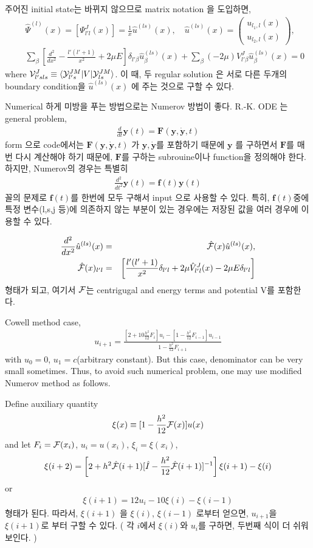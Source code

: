 \documentclass[10pt]{book}
\def\bm{\boldsymbol}
\newcommand{\bea}{\begin{eqnarray}}
\newcommand{\eea}{\end{eqnarray}}
\newcommand{\no}{\nonumber \\}
\def\la{\langle}
\def\ra{\rangle}
\begin{document}
주어진 initial state는 바뀌지 않으므로 matrix notation 을 도입하면,
\bea
& &\hat{\Psi}^{(l)}(x)=[\Psi^J_{l' l}(x)]=\frac{1}{x}\hat{u}^{(ls)}(x),
\quad \hat{u}^{(ls)}(x)=\left(\begin{array}{c} u_{l_1,l}(x) \\ u_{l_2,l}(x) \end{array}\right),\no
& &\sum_{\beta}\left[\frac{d^2}{dx^2}-\frac{l'(l'+1)}{x^2}+2\mu E\right]
   \delta_{l'\beta}\hat{u}^{(ls)}_\beta (x)
   +\sum_\beta (-2\mu )V^J_{l'\beta}\hat{u}^{(ls)}_\beta(x) =0
\eea
where ${\cal V}^{J}_{l's ls}\equiv \la {\cal Y}^{JM}_{l's}|V|{\cal Y}^{JM}_{ls}\ra$.
이 때, 두 regular solution 은 서로 다른 두개의 boundary condition을 
$\hat{u}^{(ls)}(x)$ 에 주는 것으로 구할 수 있다.

Numerical 하게 미방을 푸는 방법으로는 Numerov 방법이 좋다.
R.-K. ODE 는 general problem,
\bea 
\frac{d}{dt}{\bm y}(t)={\bm F}({\bm y},\dot{\bm y}, t)
\eea 
form 으로 code에서는 ${\bm F}({\bm y},\dot{\bm y}, t)$ 가 ${\bm y},\dot{\bm y}$를 
포함하기 때문에 ${\bm y}$ 를 구하면서 ${\bm F}$를 매번 다시 계산해야 하기 때문에,
${\bm F}$를 구하는 subrouine이나 function을 정의해야 한다. 
하지만, Numerov의 경우는 특별히
\bea 
\frac{d^2}{dt^2}{\bm y}(t)={\bm f}(t){\bm y}(t)
\eea 
꼴의 문제로  ${\bm f}(t)$를 한번에 모두 구해서 input 으로 사용할 수 있다. 
특히, ${\bm f}(t)$중에 특정 변수(l,s,j 등)에 의존하지 않는 부분이 있는 경우에는
저장된 값을 여러 경우에 이용할 수 있다. 

\bea
\frac{d^2}{dx^2}\hat{u}^{(ls)}(x)&=&{\cal \hat{F}}(x) \hat{u}^{(ls)}(x),\no
\hat{\cal F}(x)_{l'l}&=&
\left[\frac{l'(l'+1)}{x^2}\delta_{l'l}+2\mu\hat{V}^J_{l'l}(x)-2\mu E\delta_{l'l}
\right]
\eea
형태가 되고, 여기서 ${\cal F}$는 
centrigugal and energy terms and potential V를 포함한다.

Cowell method case,
\bea 
u_{i+1}=\frac{[2+10\frac{h^2}{12}F_i]u_i
    -[1-\frac{h^2}{12}F_{i-1}]u_{i-1}      }{1-\frac{h^2}{12}F_{i+1}}
\eea 
with $u_0=0$, $u_1=c$(arbitrary constant). But this case, denominator can be very small sometimes.
Thus, to avoid such numerical problem, one may use modified Numerov method as follows. 

Define auxiliary quantity 
$$\xi(x)\equiv[1-\frac{h^2}{12}{\cal F}(x)]u(x)$$ 
and let $F_{i}={\cal F}(x_i)$, $u_i=u(x_i)$, $\xi_i=\xi(x_i)$,
\bea
\xi(i+2)=\left[2+h^2{\cal \hat{F}}(i+1)[\hat{I}-\frac{h^2}{12}{\cal\hat{ F}}(i+1)]^{-1}\right]\xi(i+1)-\xi(i)
\eea
or
\bea 
\xi(i+1)=12 u_i  -10 \xi(i)-\xi(i-1)
\eea 
형태가 된다. 따라서, $\xi(i+1)$ 을 $\xi(i)$, $\xi(i-1)$ 로부터 얻으면, $u_{i+1}$을 $\xi(i+1)$로 부터 구할 수 있다. 
( 각 $i$에서 $\xi(i)$와 $u_i$를 구하면, 두번째 식이 더 쉬워 보인다. )
\end{document}
